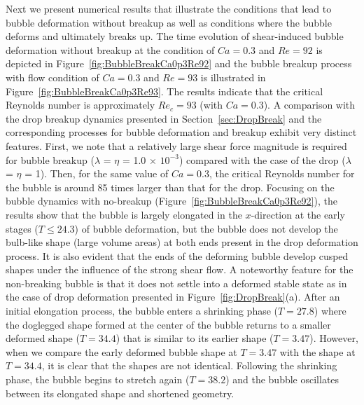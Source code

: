 \documentclass[%
 reprint,
 showkeys,
 amsmath,amssymb,
 aps,
 prfluids,
 onecolumn
]{revtex4-2}
\begin{document}
%
Next we present numerical results that illustrate the conditions that lead to
bubble deformation without breakup as well as conditions where the bubble
deforms and ultimately breaks up.  The time evolution of shear-induced bubble
deformation without breakup at the condition of $Ca=0.3$ and $Re=92$ is
depicted in Figure~\ref{fig:BubbleBreakCa0p3Re92} and the bubble breakup
process with flow condition of $Ca=0.3$ and $Re=93$ is illustrated in
Figure~\ref{fig:BubbleBreakCa0p3Re93}.  The results indicate that the critical
Reynolds number is approximately $Re_c = 93$ (with $Ca=0.3$).  A comparison
with the drop breakup dynamics presented in Section~\ref{sec:DropBreak} and the
corresponding processes for bubble deformation and breakup exhibit very
distinct features.  First, we note that a relatively large shear force
magnitude is required for bubble breakup 
($\lambda$ = $\eta$ = 1.0 $\times$ $10^{-3}$) 
compared with the case of the drop ($\lambda$ = $\eta$ = 1). Then,
for the same value of $Ca=0.3$, the critical Reynolds number for the bubble is
around 85 times larger than that for the drop.  Focusing on the bubble dynamics
with no-breakup (Figure~\ref{fig:BubbleBreakCa0p3Re92}), the results show that
the bubble is largely elongated in the $x$-direction at the early stages ($T
\leq 24.3$) of bubble deformation, but the bubble does not develop the
bulb-like shape (large volume areas) at both ends present in the drop
deformation process.  It is also evident that the ends of the deforming bubble
develop cusped shapes under the influence of the strong shear flow.  A
noteworthy feature for the non-breaking bubble is that it does not settle into
a deformed stable state as in the case of drop deformation presented in
Figure~\ref{fig:DropBreak}(a).  After an initial elongation process, the bubble
enters a shrinking phase ($T = 27.8$) where the doglegged shape formed at the
center of the bubble returns to a smaller deformed shape ($T = 34.4$) that is
similar to its earlier shape ($T=3.47$).  However, when we compare the early
deformed bubble shape at $T = 3.47$ with the shape at $T = 34.4$, it is clear
that the shapes are not identical.  Following the shrinking phase, the bubble
begins to stretch again ($T = 38.2$) and the bubble oscillates between its
elongated shape and shortened geometry.  
\end{document}
